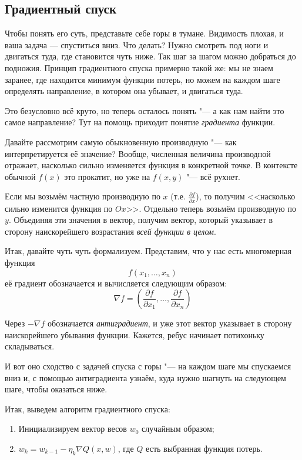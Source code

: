 \subsection*{Градиентный спуск}

Чтобы понять его суть, представьте себе горы в тумане. Видимость плохая, и ваша задача --- спуститься вниз. Что делать? Нужно смотреть под ноги и двигаться туда, где становится чуть ниже. Так шаг за шагом можно добраться до подножия. Принцип градиентного спуска примерно такой же: мы не знаем заранее, где находится минимум функции потерь, но можем на каждом шаге определять направление, в котором она убывает, и двигаться туда.

Это безусловно всё круто, но теперь осталось понять "--- а как нам найти это самое направление? Тут на помощь приходит понятие \textit{градиента} функции.

Давайте рассмотрим самую обыкновенную производную "--- как интерпретируется её значение? Вообще, численная величина производной отражает, насколько сильно изменяется функция в конкретной точке. В контексте обычной $f(x)$ это прокатит, но уже на $f(x, y)$ "--- всё рухнет. 

Если мы возьмём частную производную по $x$ (т.е. $\frac {\partial f}{\partial x}$), то получим <<насколько сильно изменится функция по $Ox$>>. Отдельно теперь возьмём производную по $y$. Объединяя эти значения в вектор, получим вектор, который указывает в сторону наискорейшего возрастания \textit{всей функции в целом}.

Итак, давайте чуть чуть формализуем. Представим, что у нас есть многомерная функция 
\[
f(x_1, \dots, x_n)
\]
её градиент обозначается и вычисляется следующим образом:
\[
\nabla f = (\frac{\partial f} {\partial x_1}, \dots, \frac{\partial f} {\partial x_n})
\]

Через $-\nabla f$ обозначается \textit{антиградиент}, и уже этот вектор указывает в сторону наискорейшего убывания функции. Кажется, ребус начинает потихоньку складываться.

И вот оно сходство с задачей спуска с горы "--- на каждом шаге мы спускаемся вниз и, с помощью антиградиента узнаём, куда нужно шагнуть на следующем шаге, чтобы оказаться ниже.

\newpage
Итак, выведем алгоритм градиентного спуска:
\begin{enumerate}
    \item Инициализируем вектор весов $w_0$ случайным образом;
    \item $w_k = w_{k-1} - \eta_k \nabla Q(x, w)$, где $Q$ есть выбранная функция потерь.
\end{enumerate}

